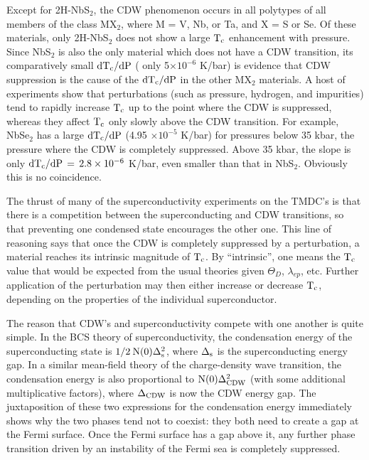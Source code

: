         Except for 2H-NbS$_2$, the CDW phenomenon occurs in all polytypes
of all members of the class MX$_2$, where M = V, Nb, or Ta, and X = S or
Se.\cite{friend79} Of these materials, only 2H-NbS$_2$ does not show a
large $\rm T_c$ enhancement with pressure.  Since NbS$_2$ is also the only
material which does not have a CDW transition, its comparatively small $\rm
dT_c/dP$ ( only 5$\times 10^{-6}$ K/bar) is evidence that CDW suppression
is the cause of the $\rm dT_c/dP$ in the other MX$_2$
materials.\cite{friend79,smith72} A host of experiments show that
perturbations (such as pressure, hydrogen, and impurities) tend to rapidly
increase $\rm T_c$ up to the point where the CDW is suppressed, whereas
they affect $\rm T_c$ only slowly above the CDW transition.  For example,
NbSe$_2$ has a large $\rm dT_c/dP$ (4.95 $\times 10 ^{-5}$ K/bar) for
pressures below 35 kbar, the pressure where the CDW is completely
suppressed.  Above 35 kbar, the slope is only $\rm dT_c/dP \, = \, 2.8
\times 10^{-6}$ K/bar,   even smaller than  that in  NbS$_2$.\cite{smith72}
Obviously this is no coincidence.

           The thrust of many of the superconductivity experiments on the
TMDC's is that there is a competition between the superconducting and CDW
transitions, so that preventing one condensed state encourages the other
one.  This line of reasoning says that once the CDW is completely
suppressed by a perturbation, a material reaches its intrinsic magnitude of
$\rm T_c$.\cite{fuller81} By ``intrinsic'', one means the $\rm T_c$ value
that would be expected from the usual theories given $\Theta_D$,
$\lambda_{ep}$, etc.  Further application of the perturbation may then
either increase or decrease $\rm T_c$, depending on the properties of the
individual superconductor.

        The reason that CDW's and superconductivity compete with one
another is quite simple.  In the BCS theory of superconductivity,\cite{bcs}
the condensation energy of the superconducting state is $\rm 1/2 \: N(0)
\Delta_s^2$, where $\rm \Delta_s$ is the superconducting energy gap.  In a
similar mean-field  theory  of   the  charge-density wave   transition, the
condensation energy is also proportional to $\rm N(0) \Delta_{CDW}^2$ (with
some additional multiplicative factors),\cite{rice73} where $\rm
\Delta_{CDW}$ is now  the CDW  energy gap.  The  juxtaposition of these two
expressions  for  the  condensation energy   immediately shows  why the two
phases tend  not to coexist: they both  need to create a gap  at the  Fermi
surface.   Once the Fermi  surface has a  gap  above it,  any further phase
transition driven  by   an  instability  of  the  Fermi  sea  is completely
suppressed.

